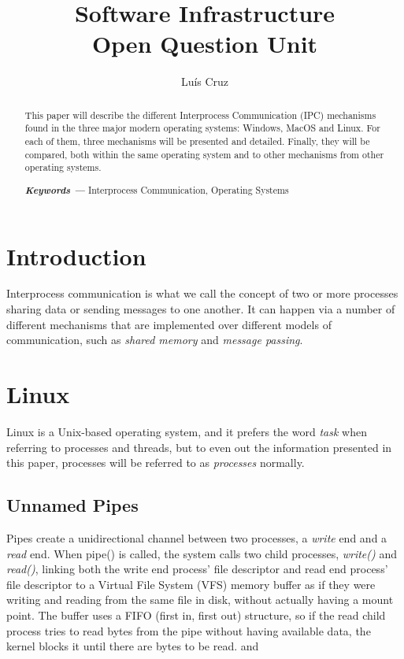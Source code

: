 \documentclass[12pt]{article}
\title{Software Infrastructure\\ Open Question \nth{1} Unit}
\author{Luís Cruz\inst{1} }
\providecommand{\keywords}[1]{\textbf{\textit{Keywords ---}} #1}
\begin{document}
 

\maketitle

\begin{abstract}
This paper will describe the different Interprocess Communication (IPC) mechanisms found in the three major modern operating systems: Windows, MacOS and Linux. For each of them, three mechanisms will be presented and detailed. Finally, they will be compared, both within the same operating system and to other mechanisms from other operating systems.
  
  \keywords{Interprocess Communication, Operating Systems}
\end{abstract}

\emph{}
\section{Introduction}
Interprocess communication is what we call the concept of two or more processes sharing data or sending messages to one another. It can happen via a number of different mechanisms that are implemented over different models of communication, such as \emph{shared memory} and \emph{message passing}. \cite{silberschatz:1}

\section{Linux}
Linux is a Unix-based operating system, and it prefers the word \emph{task} when referring to processes and threads, but to even out the information presented in this paper, processes will be referred to as \emph{processes} normally.
\subsection{Unnamed Pipes}
Pipes create a unidirectional channel between two processes, a \emph{write} end and a \emph{read} end. When pipe() is called, the system calls two child processes, \emph{write()} and \emph{read()}, linking both the write end process’ file descriptor and read end process’ file descriptor to a Virtual File System (VFS) memory buffer as if they were writing and reading from the same file in disk, without actually having a mount point.
The buffer uses a FIFO (first in, first out) structure, so if the read child process tries to read bytes from the pipe without having available data, the kernel blocks it until there are bytes to be read. \cite{pipe:1} and \cite{ipclinux:1}
\end{document}
